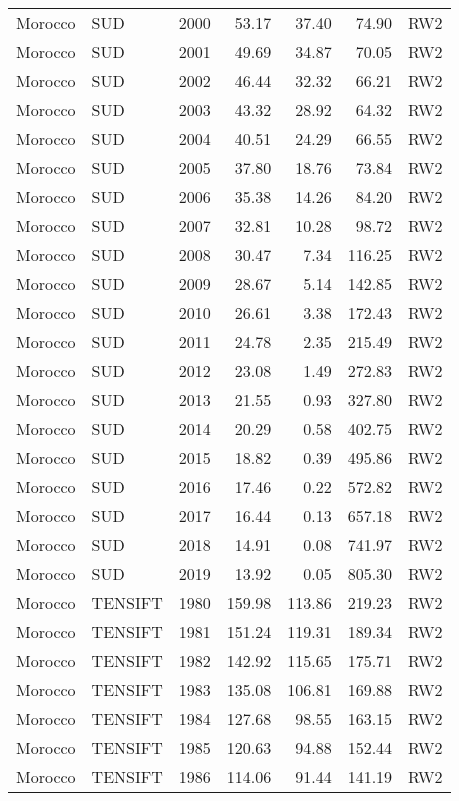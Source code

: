 \begin{longtable}{lllrrrl}
  Morocco & SUD & 2000 & 53.17 & 37.40 & 74.90 & RW2 \\ 
  Morocco & SUD & 2001 & 49.69 & 34.87 & 70.05 & RW2 \\ 
  Morocco & SUD & 2002 & 46.44 & 32.32 & 66.21 & RW2 \\ 
  Morocco & SUD & 2003 & 43.32 & 28.92 & 64.32 & RW2 \\ 
  Morocco & SUD & 2004 & 40.51 & 24.29 & 66.55 & RW2 \\ 
  Morocco & SUD & 2005 & 37.80 & 18.76 & 73.84 & RW2 \\ 
  Morocco & SUD & 2006 & 35.38 & 14.26 & 84.20 & RW2 \\ 
  Morocco & SUD & 2007 & 32.81 & 10.28 & 98.72 & RW2 \\ 
  Morocco & SUD & 2008 & 30.47 & 7.34 & 116.25 & RW2 \\ 
  Morocco & SUD & 2009 & 28.67 & 5.14 & 142.85 & RW2 \\ 
  Morocco & SUD & 2010 & 26.61 & 3.38 & 172.43 & RW2 \\ 
  Morocco & SUD & 2011 & 24.78 & 2.35 & 215.49 & RW2 \\ 
  Morocco & SUD & 2012 & 23.08 & 1.49 & 272.83 & RW2 \\ 
  Morocco & SUD & 2013 & 21.55 & 0.93 & 327.80 & RW2 \\ 
  Morocco & SUD & 2014 & 20.29 & 0.58 & 402.75 & RW2 \\ 
  Morocco & SUD & 2015 & 18.82 & 0.39 & 495.86 & RW2 \\ 
  Morocco & SUD & 2016 & 17.46 & 0.22 & 572.82 & RW2 \\ 
  Morocco & SUD & 2017 & 16.44 & 0.13 & 657.18 & RW2 \\ 
  Morocco & SUD & 2018 & 14.91 & 0.08 & 741.97 & RW2 \\ 
  Morocco & SUD & 2019 & 13.92 & 0.05 & 805.30 & RW2 \\ 
  Morocco & TENSIFT & 1980 & 159.98 & 113.86 & 219.23 & RW2 \\ 
  Morocco & TENSIFT & 1981 & 151.24 & 119.31 & 189.34 & RW2 \\ 
  Morocco & TENSIFT & 1982 & 142.92 & 115.65 & 175.71 & RW2 \\ 
  Morocco & TENSIFT & 1983 & 135.08 & 106.81 & 169.88 & RW2 \\ 
  Morocco & TENSIFT & 1984 & 127.68 & 98.55 & 163.15 & RW2 \\ 
  Morocco & TENSIFT & 1985 & 120.63 & 94.88 & 152.44 & RW2 \\ 
  Morocco & TENSIFT & 1986 & 114.06 & 91.44 & 141.19 & RW2 \\ 

\end{longtable}
